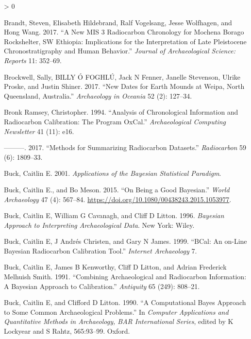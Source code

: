 \documentclass[
]{article}
\newlength{\cslhangindent}
\newenvironment{CSLReferences}[2] %
 {%
  \setlength{\parindent}{0pt}
  \ifodd #1 \everypar{\setlength{\hangindent}{\cslhangindent}}\ignorespaces\fi
  \ifnum #2 > 0
  \setlength{\parskip}{#2\baselineskip}
  \fi
 }%
 {}
\begin{document}
\begin{CSLReferences}{1}{0}
\leavevmode\hypertarget{ref-brandt_new_2017}{}%
Brandt, Steven, Elisabeth Hildebrand, Ralf Vogelsang, Jesse Wolfhagen,
and Hong Wang. 2017. {``A New {MIS} 3 Radiocarbon Chronology for
{Mochena} {Borago} {Rockshelter}, {SW} {Ethiopia}: {Implications} for
the Interpretation of {Late} {Pleistocene} Chronostratigraphy and Human
Behavior.''} \emph{Journal of Archaeological Science: Reports} 11:
352--69.

\leavevmode\hypertarget{ref-brockwell_new_2017}{}%
Brockwell, Sally, BILLY Ó FOGHLÚ, Jack N Fenner, Janelle Stevenson,
Ulrike Proske, and Justin Shiner. 2017. {``New Dates for Earth Mounds at
{Weipa}, {North} {Queensland}, {Australia}.''} \emph{Archaeology in
Oceania} 52 (2): 127--34.

\leavevmode\hypertarget{ref-bronk_ramsey_analysis_1994}{}%
Bronk Ramsey, Christopher. 1994. {``Analysis of Chronological
Information and Radiocarbon Calibration: The Program {OxCal}.''}
\emph{Archaeological Computing Newsletter} 41 (11): e16.

\leavevmode\hypertarget{ref-bronk_ramsey_methods_2017}{}%
---------. 2017. {``Methods for Summarizing Radiocarbon Datasets.''}
\emph{Radiocarbon} 59 (6): 1809--33.

\leavevmode\hypertarget{ref-buck_applications_2001}{}%
Buck, Caitlin E. 2001. \emph{Applications of the {Bayesian} Statistical
Paradigm}.

\leavevmode\hypertarget{ref-buck_being_2015}{}%
Buck, Caitlin E., and Bo Meson. 2015. {``On Being a Good {Bayesian}.''}
\emph{World Archaeology} 47 (4): 567--84.
\url{https://doi.org/10.1080/00438243.2015.1053977}.

\leavevmode\hypertarget{ref-buck_bayesian_1996}{}%
Buck, Caitlin E, William G Cavanagh, and Cliff D Litton. 1996.
\emph{Bayesian {Approach} to {Interpreting} {Archaeological} {Data}}.
New York: Wiley.

\leavevmode\hypertarget{ref-buck_bcal_1999}{}%
Buck, Caitlin E, J Andrés Christen, and Gary N James. 1999. {``{BCal}:
An on-Line {Bayesian} Radiocarbon Calibration Tool.''} \emph{Internet
Archaeology} 7.

\leavevmode\hypertarget{ref-buck_combining_1991}{}%
Buck, Caitlin E, James B Kenworthy, Cliff D Litton, and Adrian Frederick
Melhuish Smith. 1991. {``Combining Archaeological and Radiocarbon
Information: A {Bayesian} Approach to Calibration.''} \emph{Antiquity}
65 (249): 808--21.

\leavevmode\hypertarget{ref-buck_computational_1990}{}%
Buck, Caitlin E, and Clifford D Litton. 1990. {``A Computational {Bayes}
Approach to Some Common Archaeological Problems.''} In \emph{Computer
{Applications} and {Quantitative} {Methods} in {Archaeology}, {BAR}
{International} {Series}}, edited by K Lockyear and S Rahtz, 565:93--99.
Oxford.


\end{CSLReferences}
\end{document}
